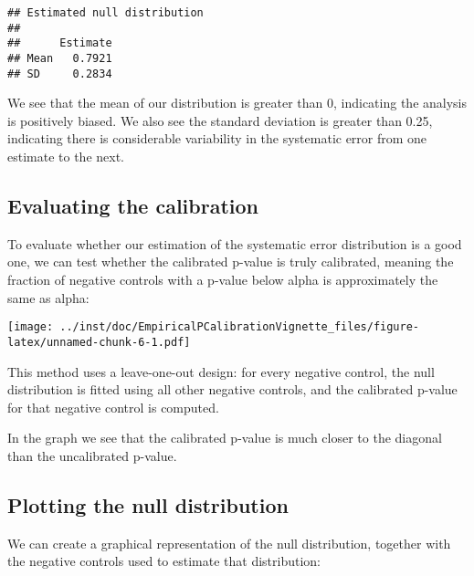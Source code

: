 \documentclass[]{article}
\newenvironment{Shaded}{\begin{snugshade}}{\end{snugshade}}
\newcommand{\KeywordTok}[1]{\textcolor[rgb]{0.13,0.29,0.53}{\textbf{#1}}}
\newcommand{\NormalTok}[1]{#1}
\newcommand{\OperatorTok}[1]{\textcolor[rgb]{0.81,0.36,0.00}{\textbf{#1}}}
\begin{document}
\begin{verbatim}
## Estimated null distribution
## 
##      Estimate
## Mean   0.7921
## SD     0.2834
\end{verbatim}

We see that the mean of our distribution is greater than 0, indicating
the analysis is positively biased. We also see the standard deviation is
greater than 0.25, indicating there is considerable variability in the
systematic error from one estimate to the next.

\hypertarget{evaluating-the-calibration}{%
\subsection{Evaluating the
calibration}\label{evaluating-the-calibration}}

To evaluate whether our estimation of the systematic error distribution
is a good one, we can test whether the calibrated p-value is truly
calibrated, meaning the fraction of negative controls with a p-value
below alpha is approximately the same as alpha:

\begin{Shaded}
\end{Shaded}

\texttt{[image: ../inst/doc/EmpiricalPCalibrationVignette\_files/figure-latex/unnamed-chunk-6-1.pdf]}

This method uses a leave-one-out design: for every negative control, the
null distribution is fitted using all other negative controls, and the
calibrated p-value for that negative control is computed.

In the graph we see that the calibrated p-value is much closer to the
diagonal than the uncalibrated p-value.

\hypertarget{plotting-the-null-distribution}{%
\subsection{Plotting the null
distribution}\label{plotting-the-null-distribution}}

We can create a graphical representation of the null distribution,
together with the negative controls used to estimate that distribution:
\end{document}
